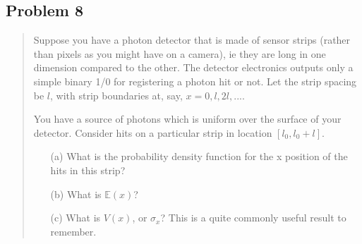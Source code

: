 \documentclass[10pt]{article}
\begin{document}
\subsection*{Problem 8}
\begin{quote}
	Suppose you have a photon detector that is made of sensor strips (rather than pixels as you might have on a camera), ie they are long in one
	dimension compared to the other. The detector electronics outputs only a simple binary 1/0 for registering a photon hit or not. Let the strip
	spacing be $l$, with strip boundaries at, say, $x=0,l,2l,....$

	You have a source of photons which is uniform over the surface of your detector. Consider hits on a particular strip in location $[l_0, l_0 + l]$.
	\begin{enumerate}
		\item[(a)] What is the probability density function for the x position of the hits in this strip?
		\item[(b)] What is $\mathbb{E}(x)$?
		\item[(c)] What is $V(x)$, or $\sigma_{x}$? This is a quite commonly useful result to remember.
	\end{enumerate}
\end{quote}

\divider
\end{document}
